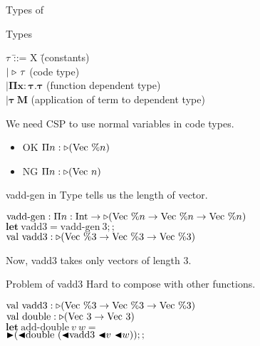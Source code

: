 \documentclass[dvipdfmx,aspectratio=169, 20pt]{beamer}
\begin{document}
\begin{frame}[fragile]{Types of \LMD}
    \begin{block}{Types}
    \begin{tabbing}
        \hspace{5mm} \( \tau \) \= ::= X \hspace{20mm} \= (constants) \\
        \> \( \mid {\mathop{\triangleright}}\ \tau \) \> (code type) \\
        \> \( \bm{\mid \Pi x:\tau.\tau} \) \> (function dependent type) \\
        \> \( \bm{\mid \tau\ M} \) \> (application of term to dependent type)
    \end{tabbing}
    \end{block}
    We need CSP to use normal variables in code types.
    \begin{itemize}
        \item OK  \( \Pi n: {\mathop{\triangleright}} (\text{Vec}\ \%n) \)
        \item NG  \( \Pi n: {\mathop{\triangleright}} (\text{Vec}\ n) \)
    \end{itemize}
   \note{
    }
\end{frame}

\begin{frame}[fragile]{vadd-gen in \LMD}
    Type tells us the length of vector.
    \newcommand{\Vn}{\text{Vec}\ \%n}
    \newcommand{\Vt}{\text{Vec}\ \%3}
    \begin{tabbing}
        \hspace{5mm} \= \( \text{vadd-gen} : \Pi n:\I \to \TW (\Vn \to \Vn \to \Vn) \) \\[2mm]
        \> \( \textbf{let}\ \text{vadd3} = \text{vadd-gen}\ 3;; \) \\
        \> \( \text{val}\ \text{vadd3} : \TW (\Vt \to \Vt \to \Vt) \) \\[2mm]
    \end{tabbing}
    Now, vadd3 takes only vectors of length 3.
\end{frame}

\begin{frame}[fragile]{Problem of vadd3}
    Hard to compose with other functions.
    \newcommand{\Vn}{\text{Vec}\ \%n}
    \newcommand{\Vpt}{\text{Vec}\ \%3}
    \newcommand{\Vt}{\text{Vec}\ 3}
    \begin{tabbing}
        \hspace{5mm} \= \( \text{val}\ \text{vadd3} : \TW (\Vpt \to \Vpt \to \Vpt) \) \\
        \> \( \text{val}\ \text{double} : \TW (\Vt \to \Vt) \) \\[2mm]
        \> \( \textbf{let}\ \text{add-double}\ v\ w = \) \\
        \> \hspace{5mm} \( {\mathop{\blacktriangleright}} ({\mathop{\blacktriangleleft}}\text{double}\ ({\mathop{\blacktriangleleft}} \text{vadd3}\ {\mathop{\blacktriangleleft}} v\ {\mathop{\blacktriangleleft}} w));; \) \\
    \end{tabbing}
\end{frame}
\end{document}
